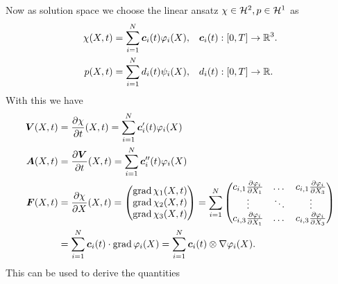 Now as solution space we choose the linear ansatz $\chi\in\H^2, p\in\H^1$ as
\begin{align}
	\chi(X,t) &= \sumi \vc_i(t)\varphi_i(X), && \vc_i(t):[0,T] \to\R^3.\\
	p(X,t) &= \sumi d_i(t)\psi_i(X), && d_i(t):[0,T] \to\R.
\end{align}
With this we have
\begin{align}
	\vV(X,t) &= \d{\chi}{t}(X,t) = \sumi \vc_i'(t)\varphi_i(X)\\
	\vA(X,t) &= \d{\vV}{t}(X,t) = \sumi \vc_i''(t)\varphi_i(X)\\
	\vF(X,t) &= \d{\chi}{X}(X,t) = \m{\grad \chi_1(X,t)\\ \grad \chi_2(X,t)\\ \grad \chi_3(X,t)}
		   = \sumi\m{c_{i,1}\d{\varphi_i}{X_1} & \dots & c_{i,1}\d{\varphi_i}{X_3}\\
		   				\vdots & \ddots & \vdots\\
		   				c_{i,3}\d{\varphi_i}{X_1} & \dots & c_{i,3}\d{\varphi_i}{X_3}}\\
		   &=\sumi \vc_i(t)\cdot \grad\varphi_i(X) = \sumi \vc_i(t)\otimes \dpi.
\end{align}
This can be used to derive the quantities
